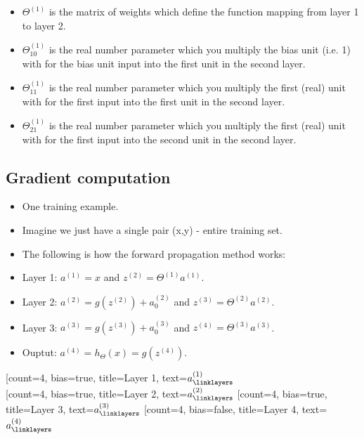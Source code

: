\documentclass{article}
\begin{document}
\begin{itemize}
  \item $\Theta^{(1)}$ is the matrix of weights which define the function mapping from layer 1 to layer 2.
  \item $\Theta^{(1)}_{10}$  is the real number parameter which you multiply the bias unit (i.e. 1) with for the bias unit input into the first unit in the second layer.
  \item $\Theta^{(1)}_{11}$ is the real number parameter which you multiply the first (real) unit with for the first input into the first unit in the second layer.
  \item $\Theta^{(1)}_{21}$  is the real number parameter which you multiply the first (real) unit with for the first input into the second unit in the second layer.
\end{itemize}

\subsection*{Gradient computation}

\begin{itemize}
  \item One training example.
  \item Imagine we just have a single pair (x,y) - entire training set.
  \item The following is how the forward propagation method works:
  \item Layer 1: $a^{(1)} = x$ and $z^{(2)} = \Theta^{(1)}a^{(1)}$.
  \item Layer 2: $a^{(2)} = g(z^{(2)}) + a^{(2)}_0$ and $z^{(3)} = \Theta^{(2)}a^{(2)}$.
  \item Layer 3: $a^{(3)} = g(z^{(3)}) + a^{(3)}_0$ and $z^{(4)} = \Theta^{(3)}a^{(3)}$.
  \item Ouptut: $a^{(4)} = h_{\Theta}(x) = g(z^{(4)})$.

\end{itemize}

\begin{neuralnetwork}[height=5]
  \newcommand{\x}[2]{$x_#2$}
  \newcommand{\hfirst}[2]{\small $a^{(1)}_#2$}
  \newcommand{\hsecond}[2]{\small $a^{(2)}_#2$}
  \newcommand{\hthird}[2]{\small $a^{(3)}_#2$}
  \newcommand{\hforth}[2]{\small $a^{(4)}_#2$}
  \hiddenlayer[count=4, bias=true, title=Layer 1, text=\hfirst] \linklayers\\
  \hiddenlayer[count=4, bias=true, title=Layer 2, text=\hsecond] \linklayers
  \hiddenlayer[count=4, bias=true, title=Layer 3, text=\hthird] \linklayers
  \hiddenlayer[count=4, bias=false, title=Layer 4, text=\hforth] \linklayers
\end{neuralnetwork}
\end{document}
